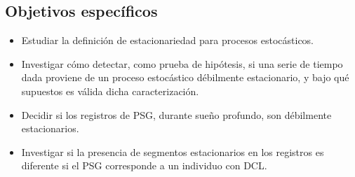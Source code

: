 \subsection{Objetivos específicos}

\begin{itemize}
\item Estudiar la definición de estacionariedad para procesos estocásticos.

\item Investigar cómo detectar, como prueba de hipótesis, si una serie de tiempo dada proviene
de un proceso estocástico débilmente estacionario, y bajo qué supuestos 
es válida dicha caracterización.

\item Decidir si los registros de PSG, durante sueño profundo, son débilmente estacionarios.

\item Investigar si la presencia de segmentos estacionarios en los registros es diferente si el
PSG corresponde a un individuo con DCL.
\end{itemize}

